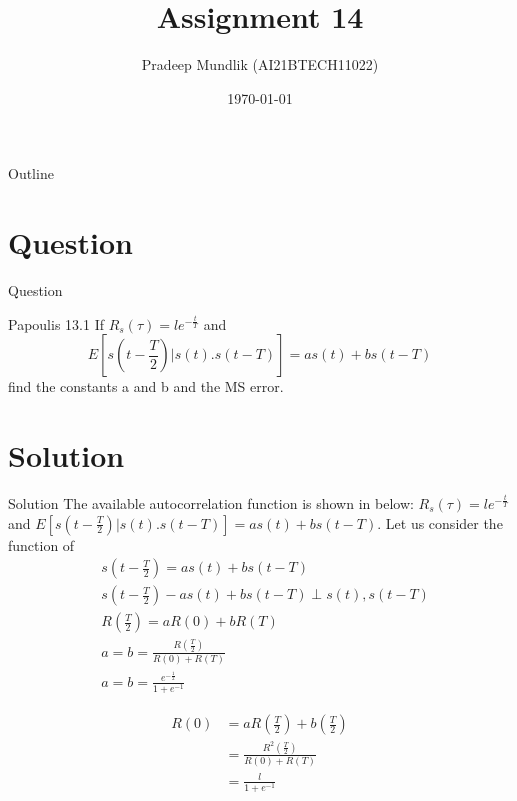 \documentclass{beamer}
\title{Assignment 14}
\author{Pradeep Mundlik (AI21BTECH11022)}
\date{\today}
\begin{document}
\begin{frame}
    \titlepage 
\end{frame}



\begin{frame}{Outline}
    \tableofcontents
\end{frame}


\section{Question}
\begin{frame}{Question}
    \begin{block}{Papoulis 13.1}
        If $R_s(\tau) = l e^{-\frac{t}{T}}$ and 
        $$ E[s\left(t - \frac{T}{2}\right)|s(t).s(t-T)] = as(t) + bs(t-T) $$
        find the constants a and b and the MS error. 
    \end{block} 
\end{frame}

\section{Solution}
\begin{frame}{Solution}
        The available autocorrelation function is shown in below:
        $R_s(\tau) = l e^{-\frac{t}{T}}$ and $ E[s\left(t - \frac{T}{2}\right)|s(t).s(t-T)] = as(t) + bs(t-T) $. 
        Let us consider the function of 
        \begin{align}
            &s\left(t - \frac{T}{2}\right) = as(t) + bs(t-T) \\
            &s\left(t - \frac{T}{2}\right) - as(t) + bs(t-T) \perp s(t), s(t - T) \\
            &R\left(\frac{T}{2}\right) = aR(0) + bR(T) \\
            &a = b = \frac{R\left(\frac{T}{2}\right)}{R(0)+R(T)} \\
            &a = b = \frac{e^{-\frac{1}{2}}}{1 + e^{-1}}
        \end{align}
\end{frame}
\begin{frame}
    \begin{align}
        R(0) &= aR\left(\frac{T}{2}\right) + b\left(\frac{T}{2}\right) \\
        &= \frac{R^2 \left(\frac{T}{2}\right)}{R(0) + R(T)} \\
        &= \frac{l}{1 + e^{-1}}
    \end{align}
\end{frame}
\end{document}
